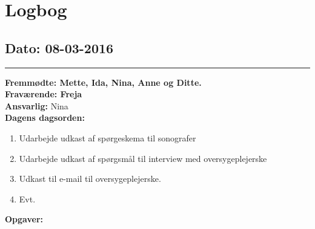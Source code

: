 \chapter{Logbog}
\section{Dato: 08-03-2016}
\hrule
\textbf{Fremmødte: Mette, Ida, Nina, Anne og Ditte.} \\
\textbf{Fraværende: Freja} \\
\textbf{Ansvarlig: }Nina  \\
\textbf{Dagens dagsorden: }
\begin{enumerate}
	\item Udarbejde udkast af spørgeskema til sonografer
	\item Udarbejde udkast af spørgsmål til interview med oversygeplejerske
	\item Udkast til e-mail til oversygeplejerske.
	\item Evt. 
\end{enumerate}

\textbf{Opgaver:} \newline

